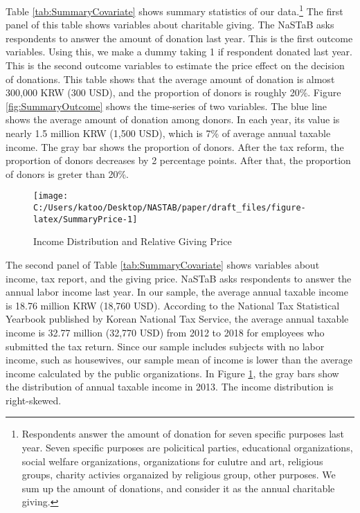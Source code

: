\documentclass[
  11pt,
  a4paper,
]{article}
\begin{document}
Table \ref{tab:SummaryCovariate}
shows summary statistics of our data.\footnote{Respondents answer the amount of donation for seven specific purposes last year. Seven specific purposes are policitical parties, educational organizations, social welfare organizations, organizations for culutre and art, religious groups, charity activies organaized by religious group, other purposes. We sum up the amount of donations, and consider it as the annual charitable giving.}
The first panel of this table shows variables about charitable giving.
The NaSTaB asks respondents to answer the amount of donation last year.
This is the first outcome variables.
Using this, we make a dummy taking 1 if respondent donated last year.
This is the second outcome variables to
estimate the price effect on the decision of donations.
This table shows that
the average amount of donation is almost 300,000 KRW (300 USD),
and the proportion of donors is roughly 20\%.
Figure \ref{fig:SummaryOutcome} shows the time-series of two variables.
The blue line shows the average amount of donation among donors.
In each year, its value is nearly 1.5 million KRW (1,500 USD),
which is 7\% of average annual taxable income.
The gray bar shows the proportion of donors.
After the tax reform, the proportion of donors decreases
by 2 percentage points.
After that, the proportion of donors is greter than 20\%.

\begin{figure}[t]

{\centering \texttt{[image: C:/Users/katoo/Desktop/NASTAB/paper/draft\_files/figure-latex/SummaryPrice-1]} 

}

\caption{Income Distribution and Relative Giving Price}\label{fig:SummaryPrice}
\end{figure}

The second panel of Table \ref{tab:SummaryCovariate}
shows variables about income, tax report, and the giving price.
NaSTaB asks respondents to answer the annual labor income last year.
In our sample,
the average annual taxable income is 18.76 million KRW (18,760 USD).
According to the National Tax Statistical Yearbook
published by Korean National Tax Service,
the average annual taxable income is
32.77 million (32,770 USD) from 2012 to 2018
for employees who submitted the tax return.
Since our sample includes subjects with no labor income, such as housewives,
our sample mean of income is lower than
the average income calculated by the public organizations.
In Figure \ref{fig:SummaryPrice},
the gray bars show the distribution of annual taxable income in 2013.
The income distribution is right-skewed.
\end{document}
